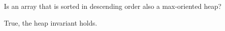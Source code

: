 \question Is an array that is sorted in descending order also a max-oriented heap?

\begin{solution}[0.25in]
True, the heap invariant holds.
\end{solution}